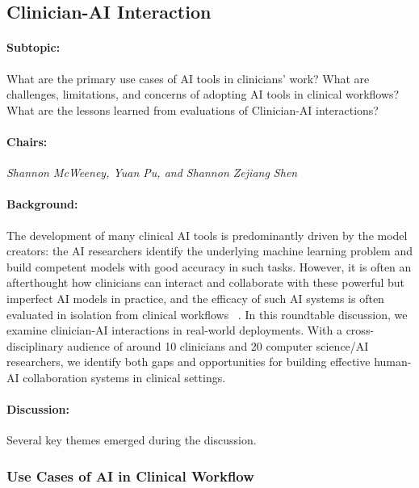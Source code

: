 \subsection{Clinician-AI Interaction}

\paragraph{Subtopic:} What are the primary use cases of AI tools in clinicians’ work? What are challenges, limitations, and concerns of adopting AI tools in clinical workflows? What are the lessons learned from evaluations of Clinician-AI interactions? 

\paragraph{Chairs:}
\textit{Shannon McWeeney, Yuan Pu, and Shannon Zejiang Shen}

\paragraph{Background:} 
The development of many clinical AI tools is predominantly driven by the model creators: the AI researchers identify the underlying machine learning problem and build competent models with good accuracy in such tasks.
However, it is often an afterthought how clinicians can interact and collaborate with these powerful but imperfect AI models in practice, and the efficacy of such AI systems is often evaluated in isolation from clinical workflows ~\citep{10.1145/3290605.3300468}.
In this roundtable discussion, we examine clinician-AI interactions in real-world deployments. 
With a cross-disciplinary audience of around 10 clinicians and 20 computer science/AI researchers, we identify both gaps and opportunities for building effective human-AI collaboration systems in clinical settings.

\paragraph{Discussion:}
Several key themes emerged during the discussion. 

\subsubsection{Use Cases of AI in Clinical Workflow}

